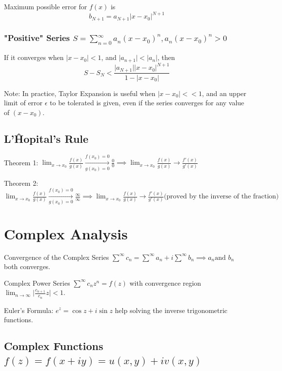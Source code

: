 \documentclass[10pt]{article}
\begin{document}
Maximum possible error for $f(x)$ is
$$
b_{N+1} = a_{N+1} \big| x-x_0 \big|^{N+1}
$$

\subsubsection["Positive" Series]{"Positive" Series $S = \sum_{n=0}^\infty a_n (x-x_0)^n, a_n (x-x_0)^n > 0$}

If it converges when $\big|x-x_0\big| < 1$, and $\big|a_{n+1}\big| < \big|a_n\big|$, then
$$
S - S_N < \frac{\big|a_{N+1}\big| \big|x-x_0\big|^{N+1}}{1-\big|x-x_0\big|}
$$

Note: In practice, Taylor Expansion is useful when $\big|x-x_0\big| << 1$, and an upper limit of error $\epsilon$ to be tolerated is given, even if the series converges for any value of $(x-x_0)$.

\subsection{L'Ĥopital's Rule}

Theorem 1:
$
\lim_{x\to x_0} \frac{f(x)}{g(x)} \overset{f(x_0)=0}{\underset{g(x_0)=0}\longrightarrow} \frac{0}{0}  \implies \lim_{x\to x_0} \frac{f(x)}{g(x)} \longrightarrow \frac{f'(x)}{g'(x)}
$

Theorem 2:
$
\lim_{x\to x_0} \frac{f(x)}{g(x)} \overset{f(x_0)=0}{\underset{g(x_0)=0}\longrightarrow} \frac{\infty}{\infty}  \implies \lim_{x\to x_0} \frac{f(x)}{g(x)} \longrightarrow \frac{f'(x)}{g'(x)} \text{(proved by the inverse of the fraction)}
$

\section{Complex Analysis}

Convergence of the Complex Series $\sum^\infty c_n = \sum^\infty a_n + i\sum^\infty b_n \implies a_n \text{and } b_n$ both converges.

Complex Power Series $\sum^\infty c_n z^n = f(z)$ with convergence region $\lim_{n\to\infty} \big|\frac{c_{n+1}}{c_n} z\big| < 1$.

Euler's Formula: $e^z = \cos z + i\sin z$ help solving the inverse trigonometric functions.

\subsection[Complex Functions]{Complex Functions $f(z) = f(x + iy) = u(x, y) + iv(x, y)$}
\end{document}
